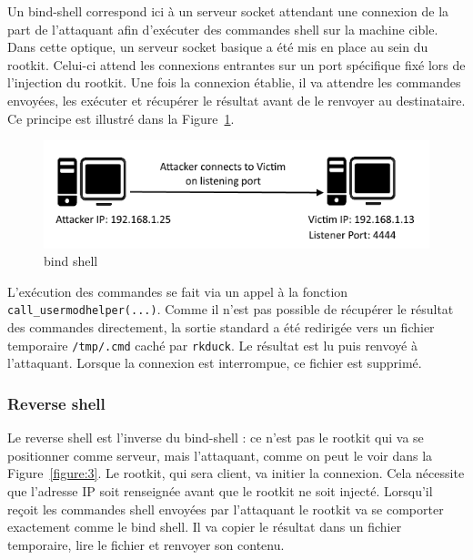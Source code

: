 \documentclass[12pt]{article}
\begin{document}
            Un bind-shell correspond ici à un serveur socket attendant une connexion de la part de l'attaquant afin d'exécuter des commandes shell sur la machine cible. Dans cette optique, un serveur socket basique a été mis en place au sein du rootkit. Celui-ci attend les connexions entrantes sur un port spécifique fixé lors de l'injection du rootkit. Une fois la connexion établie, il va attendre les commandes envoyées, les exécuter et récupérer le résultat avant de le renvoyer au destinataire. Ce principe est illustré dans la Figure~\ref{figure:2}.
            
\begin{figure}[H] 
\begin{center}
\includegraphics{./img/bind-shell.png}

\caption[dsfsdf]{bind shell}
\label{figure:2}
\end{center}
\end{figure}
            
            L'exécution des commandes se fait via un appel à la fonction \texttt{ call\_usermodhelper(...)}. Comme il n'est pas possible de récupérer le résultat des commandes directement, la sortie standard a été redirigée vers un fichier temporaire \texttt{/tmp/.cmd} caché par \texttt{rkduck}. Le résultat est lu puis renvoyé à l'attaquant. Lorsque la connexion est interrompue, ce fichier est supprimé.
            
        \subsubsection{Reverse shell}
            
            Le reverse shell est l'inverse du bind-shell : ce n'est pas le rootkit qui va se positionner comme serveur, mais l'attaquant, comme on peut le voir dans la Figure~\ref{figure:3}. Le rootkit, qui sera client, va initier la connexion. Cela nécessite que l'adresse IP soit renseignée avant que le rootkit ne soit injecté. Lorsqu'il reçoit les commandes shell envoyées par l'attaquant le rootkit va se comporter exactement comme le bind shell. Il va copier le résultat dans un fichier temporaire, lire le fichier et renvoyer son contenu.
            
\end{document}
